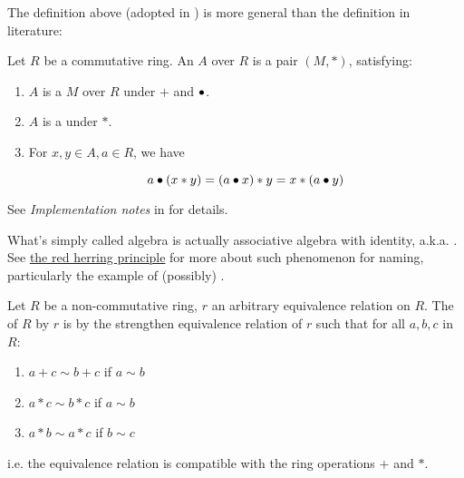 \begin{remark}
    \label{mk:AlgebraLiterature}

    The definition above (adopted in \Mathlib) is more general than the definition in literature:

    Let $R$ be a commutative ring. An  $A$ over $R$ is a pair $(M, *)$, satisfying:

    \begin{enumerate}
    \item $A$ is a  $M$ over $R$ under $+$ and $\bullet$.

    \item $A$ is a  under $*$.

    \item For $x, y \in A, a \in R$, we have
    
    $$
    a \bullet (x * y) = (a \bullet x) * y = x * (a \bullet y)
    $$

    \end{enumerate}

    See \emph{Implementation notes} in  for details.
    
\end{remark}

\begin{remark}
    \label{mk:AlgebraName}

    What's simply called algebra is actually associative algebra with identity, a.k.a. . See
    \href{https://ncatlab.org/nlab/show/red%20herring%20principle}{the red herring principle}
    for more about such phenomenon for naming, particularly the example of (possibly) .
    
\end{remark}

\begin{definition}
    \label{RingQuot}
    \leanok

    Let $R$ be a non-commutative ring, $r$ an arbitrary equivalence relation on $R$.
    The  of $R$ by $r$
    is by the strengthen equivalence relation of $r$ such that for all $a, b, c$ in $R$:

    \begin{enumerate}

    \item $a + c \sim b + c$ if $a \sim b$
    \item $a * c \sim b * c$ if $a \sim b$
    \item $a * b \sim a * c$ if $b \sim c$
    
    \end{enumerate}

    i.e. the equivalence relation is compatible with the ring operations $+$ and $*$.

\end{definition}

